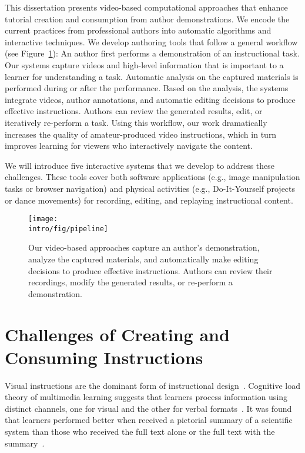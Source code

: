 This dissertation presents video-based computational approaches that enhance tutorial creation and consumption from author demonstrations.
We encode the current practices from professional authors into automatic algorithms and interactive techniques.
%
We develop authoring tools that follow a general workflow (see Figure~\ref{fig:general_pipeline}): An author first performs a demonstration of an instructional task. Our systems capture videos and high-level information that is important to a learner for understanding a task. Automatic analysis on the captured materials is performed during or after the performance. Based on the analysis, the systems integrate videos, author annotations, and automatic editing decisions to produce effective instructions. Authors can review the generated results, edit, or iteratively re-perform a task.
%
Using this workflow, our work dramatically increases the quality of amateur-produced video instructions, which in turn improves learning for viewers who interactively navigate the content.

We will introduce five interactive systems that we develop to address these challenges. These tools cover both software applications (e.g., image manipulation tasks or browser navigation) and physical activities (e.g., Do-It-Yourself projects or dance movements) for recording, editing, and replaying instructional content.

\begin{figure}[t!]
  \centering
  \texttt{[image: \\intro/fig/pipeline]}
  \caption{Our video-based approaches capture an author's demonstration, analyze the captured materials, and automatically make editing decisions to produce effective instructions. Authors can review their recordings, modify the generated results, or re-perform a demonstration.}
  \label{fig:general_pipeline}
\end{figure}


\section{Challenges of Creating and Consuming Instructions}

Visual instructions are the dominant form of instructional design~\cite{mijksenaar1999open}. Cognitive load theory of multimedia learning suggests that learners process information using distinct channels, one for visual and the other for verbal formats~\cite{sweller1998cognitive,sweller1988cognitive,paas2003cognitive}. It was found that learners performed better when received a pictorial summary of a scientific system than those who received the full text alone or the full text with the summary~\cite{mayer1996less}.

